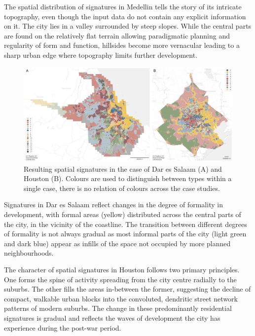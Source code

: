The spatial distribution of signatures in Medellin tells the story of its intricate
topography, even though the input data do not contain any explicit information
on it. The
city lies in a valley surrounded by steep slopes. While the central parts are
found on the
relatively flat terrain allowing paradigmatic planning and regularity of form
and function, hillsides become more vernacular leading to a sharp urban edge where
topography limits further development.

\begin{figure}
    \includegraphics[width=\linewidth]{figures/maps2.png}
    \caption{Resulting spatial signatures in the case of Dar es Salaam (A) and Houston (B).
    Colours are used to distinguish between types within a single case, there is no relation of colours across the case studies.}
    \label{fig:maps2}
\end{figure}

Signatures in Dar es Salaam reflect changes in the degree of formality in development, with
formal areas (yellow) distributed across the central parts of the city, in the vicinity
of the
coastline. The transition between different degrees of formality is not always gradual
as most informal parts of the city (light green and dark blue) appear as
infills of the space not occupied by more planned neighbourhoods.

The character of spatial signatures in Houston follows two primary principles.
One
forms the spine of activity spreading from the city centre radially to the suburbs. The
other fills the areas in-between the former, suggesting the decline of
compact, walkable urban blocks into the convoluted, dendritic street network patterns of
modern suburbs. The change in these predominantly residential signatures is gradual and
reflects the waves of development the city has experience during the post-war
period.

